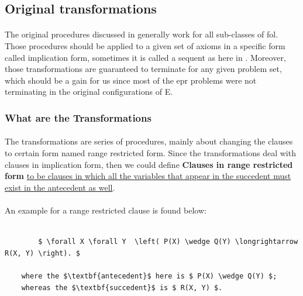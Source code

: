 \subsection{Original transformations}\label{sub:c3s1s1}
	\paragraph{}
	The original procedures discussed in \cite{BMUG06} generally work for all sub-classes of \ac{fol}. Those procedures should be applied to a given set of axioms in a specific form called implication form, sometimes it is called a sequent as here in \cite{sep-reasoning-automated}. Moreover, those transformations are guaranteed to terminate for any given problem set, which should be a gain for us since most of the \ac{epr} problems were not terminating in the original configurations of E.  

	\subsubsection{What are the Transformations}
	
		\paragraph{} 
		The transformations are series of procedures, mainly about changing the clauses to certain form named range restricted form. Since the transformations deal with clauses in implication form, then we could define \textbf{Clauses in range restricted form} \ul{to be clauses in which all the variables that appear in the succedent must exist in the antecedent as well}.
	
		\paragraph{} 
		An example for a range restricted clause is found below:
			\begin{lstlisting}[caption=Range Restricted Clause Example,frame=single,mathescape]			
		
		$ \forall X \forall Y  \left( P(X) \wedge Q(Y) \longrightarrow R(X, Y) \right). $				
		
	where the $\textbf{antecedent}$ here is $ P(X) \wedge Q(Y) $;
	whereas the $\textbf{succedent}$ is $ R(X, Y) $.
 			\end{lstlisting}
		
		

